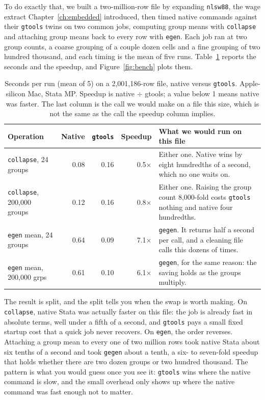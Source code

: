 To do exactly that, we built a two-million-row file by expanding \texttt{nlsw88}, the wage extract Chapter~\ref{ch:embedded} introduced, then timed native commands against their \texttt{gtools} twins on two common jobs, computing group means with \texttt{collapse} and attaching group means back to every row with \texttt{egen}. Each job ran at two group counts, a coarse grouping of a couple dozen cells and a fine grouping of two hundred thousand, and each timing is the mean of five runs. Table~\ref{tab:bench} reports the seconds and the speedup, and Figure~\ref{fig:bench} plots them.

\begin{table}[htbp]
\footnotesize
\caption[gtools timings on two million rows]{Seconds per run (mean of 5) on a 2{,}001{,}186-row file, native versus \texttt{gtools}. Apple-silicon Mac, Stata MP. Speedup is native $\div$ gtools; a value below 1 means native was faster. The last column is the call we would make on a file this size, which is not the same as the call the speedup column implies.}
\label{tab:bench}
\noindent\begin{tabular}{@{}lrrrp{8.4cm}@{}}
\hline
Operation & Native & \texttt{gtools} & Speedup & What we would run on this file \\
\hline
\texttt{collapse}, 24 groups        & 0.08 & 0.16 & 0.5$\times$ & Either one. Native wins by eight hundredths of a second, which no one waits on. \\
\texttt{collapse}, 200{,}000 groups & 0.12 & 0.16 & 0.8$\times$ & Either one. Raising the group count 8{,}000-fold costs \texttt{gtools} nothing and native four hundredths. \\
\texttt{egen} mean, 24 groups       & 0.64 & 0.09 & 7.1$\times$ & \texttt{gegen}. It returns half a second per call, and a cleaning file calls this dozens of times. \\
\texttt{egen} mean, 200{,}000 grps  & 0.61 & 0.10 & 6.1$\times$ & \texttt{gegen}, for the same reason: the saving holds as the groups multiply. \\
\hline
\end{tabular}
\end{table}

The result is split, and the split tells you when the swap is worth making. On \texttt{collapse}, native Stata was actually faster on this file: the job is already fast in absolute terms, well under a fifth of a second, and \texttt{gtools} pays a small fixed startup cost that a quick job never recovers. On \texttt{egen}, the order reverses. Attaching a group mean to every one of two million rows took native Stata about six tenths of a second and took \texttt{gegen} about a tenth, a six- to seven-fold speedup that holds whether there are two dozen groups or two hundred thousand. The pattern is what you would guess once you see it: \texttt{gtools} wins where the native command is slow, and the small overhead only shows up where the native command was fast enough not to matter.

